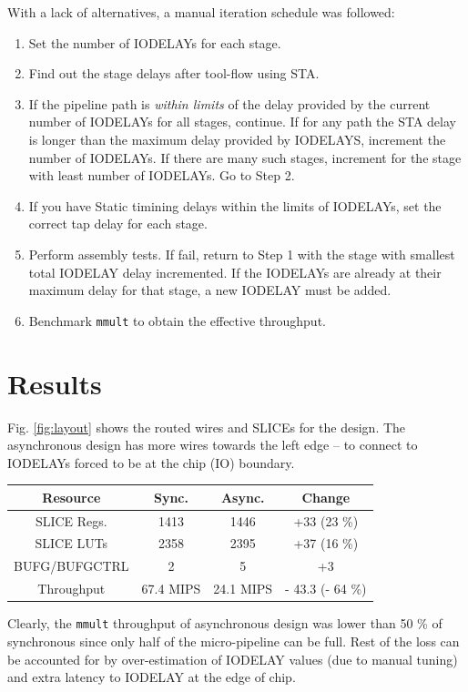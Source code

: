 \documentclass[10pt,journal,compsoc]{IEEEtran}
\begin{document}
With a lack of alternatives, a manual iteration schedule was followed:
\begin{enumerate}
	\item Set the number of IODELAYs for each stage.
	\item Find out the stage delays after tool-flow using STA.
	\item If the pipeline path is \emph{within limits} of the delay provided 
		by the current number of IODELAYs for all
		stages, continue. 
		If for any path the STA delay is longer than the
		maximum delay provided by IODELAYS, increment the number of IODELAYs.
		If there are many such stages, increment for the stage with least 
		number of IODELAYs. Go to Step 2.
	\item If you have Static timining delays within the limits of IODELAYs, set
		the correct tap delay for each stage.
	\item Perform assembly tests. If fail, return to Step 1 with the stage with
		smallest total IODELAY delay incremented. If the IODELAYs are already at their
		maximum delay for that stage, a new IODELAY must be added. 
	\item Benchmark \texttt{mmult} to obtain the effective throughput.
\end{enumerate}


\section{Results}
Fig. \ref{fig:layout} shows the routed wires and SLICEs for the design.
The asynchronous design has more wires towards the left edge -- to connect to
IODELAYs forced to be at the chip (IO) boundary. 

\begin{center}
\begin{tabular}{||c c c c||} 
	\hline
	\textbf{Resource} & \textbf{Sync.} & \textbf{Async.} & \textbf{Change} \\ [0.5ex] 
	\hline\hline
	SLICE Regs. & 1413 & 1446 & +33 (23 \%) \\ 
	\hline
	SLICE LUTs & 2358 & 2395 & +37 (16 \%) \\
	\hline
	BUFG/BUFGCTRL & 2 & 5 & +3 \\
	\hline
	Throughput & 67.4 MIPS & 24.1 MIPS & - 43.3 (- 64 \%) \\
	\hline
\end{tabular}
\end{center}

Clearly, the \texttt{mmult} throughput of asynchronous design was lower than 50 
\% of synchronous since only half of the micro-pipeline can be full. 
Rest of the loss can be accounted for by over-estimation of IODELAY values
(due to manual tuning) and extra latency to IODELAY at the edge of chip.
\\
\end{document}

